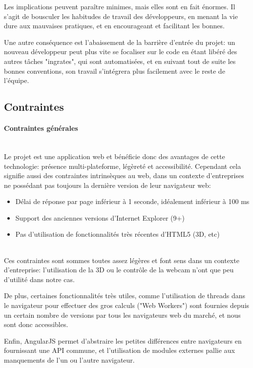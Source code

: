 \documentclass[a4paper,french,12pt]{article}
\begin{document}
	Les implications peuvent paraître minimes, mais elles sont en fait énormes. Il s'agit de bousculer les habitudes de travail des développeurs, en menant la vie dure aux mauvaises pratiques, et en encourageant et facilitant les bonnes.
	
	Une autre conséquence est l'abaissement de la barrière d'entrée du projet: un nouveau développeur peut plus vite se focaliser sur le code en étant libéré des autres tâches "ingrates", qui sont automatisées, et en suivant tout de suite les bonnes conventions, son travail s'intégrera plus facilement avec le reste de l'équipe.
				

	\subsection{Contraintes}
	
	\paragraph{Contraintes générales} ~\\
	Le projet est une application web et bénéficie donc des avantages de cette technologie: présence multi-plateforme, légèreté et accessibilité. Cependant cela signifie aussi des contraintes intrinsèques au web, dans un contexte d'entreprises ne possédant pas toujours la dernière version de leur navigateur web:~\\
	\begin{itemize}
		\item Délai de réponse par page inférieur à 1 seconde, idéalement inférieur à 100 ms
		\item Support des anciennes versions d'Internet Explorer (9+)
		\item Pas d'utilisation de fonctionnalités très récentes d'HTML5 (3D, etc)
	\end{itemize}~\\
	
 Ces contraintes sont sommes toutes assez légères et font sens dans un contexte d'entreprise: l'utilisation de la 3D ou le contrôle de la webcam n'ont que peu d'utilité dans notre cas.
 
 De plus, certaines fonctionnalités très utiles, comme l'utilisation de threads dans le navigateur pour effectuer des gros calculs ("Web Workers") sont fournies depuis un certain nombre de versions par tous les navigateurs web du marché, et nous sont donc accessibles.
 
 Enfin, AngularJS permet d'abstraire les petites différences entre navigateurs en fournissant une API commune, et l'utilisation de modules externes pallie aux manquements de l'un ou l'autre navigateur.
 
\end{document}
